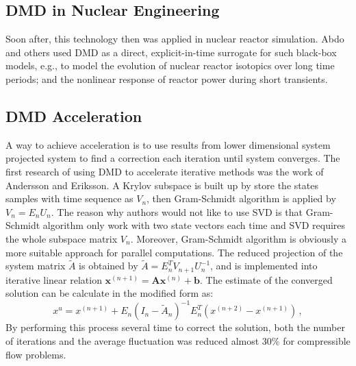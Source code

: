 \subsection{DMD in Nuclear Engineering}
Soon after, this technology then was applied in nuclear reactor simulation. 
Abdo and others used DMD as a direct, explicit-in-time surrogate for such black-box models, e.g., to model the evolution of nuclear reactor isotopics over long time periods; and the nonlinear response of reactor power during short transients.\cite{abdo_data-driven_2018}\cite{abdo_modeling_2019}\cite{elzohery2018comparison}

\subsection{DMD Acceleration}
A way to achieve acceleration is to use results from lower dimensional system projected system to find a correction each iteration until system converges.
The first research of using DMD to accelerate iterative methods was the work of Andersson and Eriksson.\cite{andersson_novel}
A Krylov subspace is built up by store the states samples with time sequence as $V_n$, then Gram-Schmidt algorithm is applied by $V_n = E_n U_n$.
The reason why authors would not like to use SVD is that Gram-Schmidt algorithm only work with two state vectors each time and SVD requires the whole subspace matrix $V_n$. 
Moreover, Gram-Schmidt algorithm is obviously a more suitable approach for parallel computations. 
The reduced projection of the system matrix $\tilde{A}$ is obtained by $\tilde{A} = E_n^T V_{n+1} U_n^{-1}$, and is implemented into iterative linear relation $\mathbf{x}^{(n+1)} = \mathbf{A}\mathbf{x}^{(n)} + \mathbf{b}$.
The estimate of the converged solution can be calculate in the modified form as:
\begin{equation}
 x^{u} = x^{(n+1)} + E_n(I_n - \tilde{A}_n)^{-1} E_n^T(x^{(n+2)} - x^{(n+1)}) \, ,
 \label{eq:andersson}
\end{equation}
By performing this process several time to correct the solution, both the number of iterations and the average fluctuation was reduced almost 30\% for compressible flow problems. 

